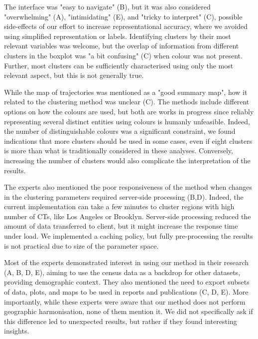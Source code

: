 The interface was "easy to navigate" (B), but it was also considered
"overwhelming" (A), "intimidating" (E), and "tricky to interpret" (C), possible
side-effects of our effort to increase  representational accuracy, where we
avoided using simplified representation or labels. Identifying clusters by their
most relevant variables was welcome, but the overlap of information from
different clusters in the boxplot was "a bit confusing" (C) when colour was not
present. Further, most clusters can be sufficiently characterised using only the
most relevant aspect, but this is not generally true. 


While the map of trajectories was mentioned as a "good summary map", how it
related to the clustering method was unclear (C). The methods include different
options on how the colours are used, but both are works in progress since reliably
representing several distinct entities using colours is humanly unfeasible.
Indeed, the number of distinguishable colours was a significant constraint, we
found indications that more clusters should be used in some cases, even if eight
clusters is more than what is traditionally considered in these analyses.
Conversely, increasing the number of clusters would also complicate the
interpretation of the results.


The experts also mentioned the poor responsiveness of the method when changes in
the clustering parameters required server-side processing (B,D). Indeed, the
current implementation can take a few minutes to cluster regions with high
number of CTs, like Los Angeles or Brooklyn. Server-side processing reduced the
amount of data transferred to client, but it might increase the response time
under load. We implemented a caching policy, but fully pre-processing the
results is not practical due to size of the parameter space.

Most of the experts demonstrated interest in using our method in their research
(A, B, D, E), aiming to use the census data as a backdrop for other datasets,
providing demographic context. They also mentioned the need to export subsets of
data, plots, and maps to be used in reports and publications (C, D, E). More
importantly, while these experts were aware that our method does not perform
geographic harmonisation, none of them mention it. We did not specifically ask
if this difference led to unexpected results, but rather if they found
interesting insights. 